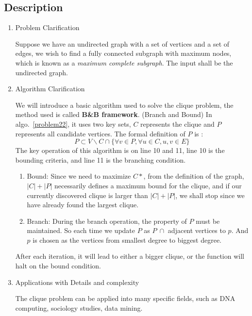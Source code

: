 \documentclass{article}
\begin{document}
\subsection*{Description}
\begin{enumerate}
\item Problem Clarification

 Suppose we have an undirected graph with a set of vertices and a set of edges, we wish to find a fully connected subgraph with maximum nodes, which is known as a \textit{maximum complete subgraph}. The input 
 shall be the undirected graph. 

 \item Algorithm Clarification

 We will introduce a basic algorithm used to solve the clique problem, the method used is called \textbf{B\&B framework}. (Branch and Bound) In algo.~\ref{problem22}, it uses two key sets, $C$ represents the clique and $P$ represents all candidate vertices. The formal definition of $P$ is :
 \[
  	P \subset V\backslash C \cap \{\forall v \in P, \forall u \in C, {u,v} \in E\}
 \] The key operation of this algorithm is on line 10 and 11, line 10 is the bounding criteria, and line 11 is the branching condition. 
 \begin{enumerate}
 \item Bound: Since we need to maximize $C*$, from the definition of the graph, $|C|+|P|$ necessarily defines a maximum bound for the clique, and if our currently discovered clique is larger than $|C|+|P|$, we shall stop since we have already found the largest clique.
 \item Branch: During the branch operation, the property of $P$ must be maintained. So each time we update $P$ as $P \ \cap $ adjacent vertices to $p$. And $p$ is chosen as the vertices from smallest degree to biggest degree.
 \end{enumerate}
After each iteration, it will lead to either a bigger clique, or the function will halt on the bound condition.

\item  Applications with Details and complexity

The clique problem can be applied into many specific fields, such as DNA computing, sociology studies, data mining.


\end{enumerate}
\end{document}
